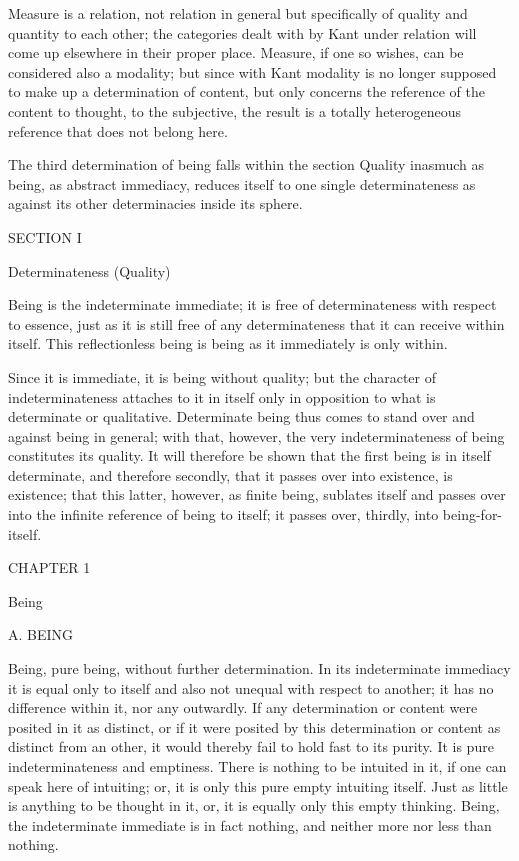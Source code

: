 Measure is a relation, not relation in general
but specifically of quality and quantity to each other;
the categories dealt with by Kant under relation
will come up elsewhere in their proper place.
Measure, if one so wishes, can be considered also a modality;
but since with Kant modality is no longer supposed to make up
a determination of content,
but only concerns
the reference of the content to thought, to the subjective,
the result is a totally heterogeneous reference
that does not belong here.

The third determination of being falls within
the section Quality inasmuch as being, as abstract immediacy,
reduces itself to one single determinateness
as against its other determinacies inside its sphere.

SECTION I

Determinateness (Quality)

Being is the indeterminate immediate;
it is free of determinateness with respect to essence,
just as it is still free of any determinateness
that it can receive within itself.
This reflectionless being is being
as it immediately is only within.

Since it is immediate, it is being without quality;
but the character of indeterminateness attaches to it in itself
only in opposition to what is determinate or qualitative.
Determinate being thus comes to stand over and against being in general;
with that, however, the very indeterminateness
of being constitutes its quality.
It will therefore be shown that the first being is
in itself determinate, and therefore secondly,
that it passes over into existence, is existence;
that this latter, however, as finite being, sublates itself
and passes over into the infinite reference of being to itself;
it passes over, thirdly, into being-for-itself.

CHAPTER 1

Being

A. BEING

Being, pure being, without further determination.
In its indeterminate immediacy it is equal only to itself
and also not unequal with respect to another;
it has no difference within it, nor any outwardly.
If any determination or content were posited in it as distinct,
or if it were posited by this determination or content
as distinct from an other,
it would thereby fail to hold fast to its purity.
It is pure indeterminateness and emptiness.
There is nothing to be intuited in it,
if one can speak here of intuiting;
or, it is only this pure empty intuiting itself.
Just as little is anything to be thought in it,
or, it is equally only this empty thinking.
Being, the indeterminate immediate is in fact nothing,
and neither more nor less than nothing.

